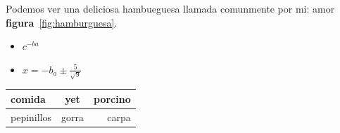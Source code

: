 \documentclass{book}
\begin{document}
Podemos ver una deliciosa hambueguesa llamada comunmente por mi: amor
\textbf{figura}~\ref{fig:hamburguesa}.

\begin{itemize}
\item $c^{-ba}$
\item $x=-b_a \pm \frac{5}{\sqrt{9}}$
 \end{itemize}

\begin{tabular}{|l | c | r|}
  \hline
  comida & yet & porcino \\
  \hline
  pepinillos & gorra & carpa \\
  \hline
  
\end{tabular}
\end{document}
